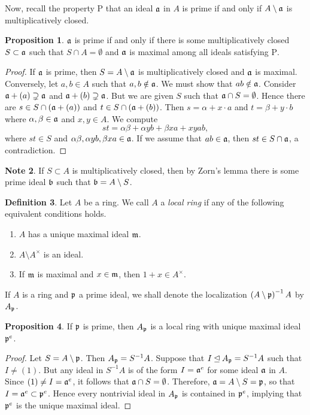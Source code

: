 \documentclass[10pt,letterpaper,cm]{nupset}
\theoremstyle{definition}
\newtheorem{definition}{Definition}[subsection]
\newtheorem{note}[definition]{Note}
\theoremstyle{theorem}
\newtheorem{prop}[definition]{Proposition}
\theoremstyle{remark}
\newcommand{\1}{\mathbf{1}}
\newcommand{\p}{\frak{p}}
\newcommand{\0}{\vec 0}
\newcommand{\Rho}{\mathrm{P}}
\begin{document}
\smallskip

 Now, recall the property $\Rho$ that an ideal $\frak{a}$ in $A$ is prime if and only if $A\setminus  \frak{a}$ is multiplicatively closed. 
 \begin{prop}
  $\frak{a}$ is prime if and only if there is some multiplicatively closed $S\subset \frak{a}$ such that $S \cap A = \emptyset$ and $\frak{a}$ is maximal among all ideals satisfying $\Rho$.
  \end{prop}
\begin{proof}
If $\frak{a}$ is prime, then $S=A \setminus \frak{a}$ is multiplicatively closed and $\frak{a}$ is maximal.
Conversely, let $a,b \in A$ such that $a,b \notin \frak{a}$. We must show that $ab \notin \frak{a}$. Consider $\frak{a} +(a) \supsetneq \frak{a}$ and $\frak{a} +(b) \supsetneq \frak{a}$. But we are given $S$ such that $\frak{a} \cap S = \emptyset$. Hence there are $s\in S \cap (\frak{a} +(a))$ and $t\in S \cap (\frak{a} +(b))$.   Then $s = \alpha + x \cdot a $ and $t= \beta + y \cdot b$ where $\alpha, \beta \in \frak{a}$ and $x,y\in A$. We compute $$  st = \alpha \beta + \alpha y b + \beta x a + xyab , $$ where $st\in S$ and $\alpha \beta, \alpha y b, \beta x a  \in \frak{a}$.  If we assume that $ab\in \frak{a}$, then $st\in S \cap \frak{a}$, a contradiction. 
\end{proof}


\begin{note}
 If $S\subset A$ is multiplicatively closed, then by Zorn's lemma there is some prime ideal $\frak{b}$ such that $\frak{b} = A \setminus S$.
 \end{note}

\begin{definition}
Let $A$ be a ring. We call $A$ a \textit{local ring} if any of the following equivalent conditions holds.
\begin{enumerate}[label=(\alph*)]
\item $A$ has a unique maximal ideal $\frak{m}$.
\item $A \setminus A^{\times}$ is an ideal.
\item If $\frak{m}$ is maximal and $x\in \frak{m}$, then $1+x \in A^{\times}$. 
\end{enumerate}
If $A$ is a ring and $\p$ a prime ideal, we shall denote the localization $\left(A\setminus \p\right)^{-1}A $ by $A_{\p}$. 
\end{definition}

\begin{prop}
 If $\p$ is prime, then $A_{\p}$ is a local ring with unique maximal ideal $\p^e$.
\end{prop}
\begin{proof}
Let $S = A \setminus \p$. Then $A_{\p} = S^{-1}A$. Suppose that $I \unlhd A_{\p} = S^{-1}A$  such that $I \ne (1)$. But any ideal in $S^{-1}A$ is of the form $I = \frak{a}^e$ for some ideal $\frak{a}$ in $A$. Since $\left(1\right) \ne I = \frak{a}^e$, it follows that $\frak{a} \cap S = \emptyset$. Therefore, $\frak{a} = A \setminus S = \p$, so that $I= \frak{a}^e \subset \p^e$. Hence every nontrivial ideal in $A_{\p}$ is contained in $\p^e$, implying that $\p^e$ is the unique maximal ideal. 
\end{proof}
\end{document}
